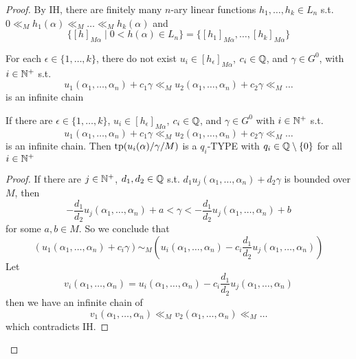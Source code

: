 \documentclass[11pt]{article}
\begin{document}
\begin{proof}
By IH, there are finitely many \(n\)-ary linear functions \(h_1,\dots,h_k\in L_n\)
s.t. \(0\ll_Mh_1(\alpha)\ll_M\dots\ll_Mh_k(\alpha)\) and
\begin{equation*}
\{[h]_{M\alpha}\mid 0<h(\alpha)\in L_n\}=\{[h_1]_{M\alpha},\dots,[h_k]_{M\alpha}\}
\end{equation*}
\begin{claim}
For each \(\epsilon\in\{1,\dots,k\}\), there do not
exist \(u_i\in[h_\epsilon]_{M\alpha}\), \(c_i\in\mathbb{Q}\), and \(\gamma\in G^0\), with \(i\in\mathbb{N}^+\)
s.t.
\begin{equation*}
u_1(\alpha_1,\dots,\alpha_n)+c_1\gamma\ll_Mu_2(\alpha_1,\dots,\alpha_n)+c_2\gamma\ll_M\dots
\end{equation*}
is an infinite chain
\end{claim}

\begin{claim}
If there are \(\epsilon\in\{1,\dots,k\}\), \(u_i\in[h_\epsilon]_{M\alpha}\), \(c_i\in\mathbb{Q}\),
and \(\gamma\in G^0\) with \(i\in\mathbb{N}^+\) s.t.
\begin{equation*}
u_1(\alpha_1,\dots,\alpha_n)+c_1\gamma\ll_Mu_2(\alpha_1,\dots,\alpha_n)+c_2\gamma\ll_M\dots
\end{equation*}
is an infinite chain. Then \(\operatorname{tp}(u_i(\alpha)/\gamma/M)\) is a \(q_i\)-TYPE
with \(q_i\in\mathbb{Q}\setminus\{0\}\) for all \(i\in\mathbb{N}^+\)
\end{claim}

\begin{proof}
If there are \(j\in\mathbb{N}^+\), \(d_1,d_2\in\mathbb{Q}\) s.t. \(d_1u_j(\alpha_1,\dots,\alpha_n)+d_2\gamma\) is bounded over \(M\), then
\begin{equation*}
-\frac{d_1}{d_2}u_j(\alpha_1,\dots,\alpha_n)+a<\gamma<-\frac{d_1}{d_2}u_j(\alpha_1,\dots,\alpha_n)+b
\end{equation*}
for some \(a,b\in M\). So we conclude that
\begin{equation*}
(u_1(\alpha_1,\dots,\alpha_n)+c_i\gamma)\sim_M
(u_i(\alpha_1,\dots,\alpha_n)-c_i\frac{d_1}{d_2}u_j(\alpha_1,\dots,\alpha_n))
\end{equation*}
Let
\begin{equation*}
v_i(\alpha_1,\dots,\alpha_n)=u_i(\alpha_1,\dots,\alpha_n)-c_i
\frac{d_1}{d_2}u_j(\alpha_1,\dots,\alpha_n)
\end{equation*}
then we have an infinite chain of
\begin{equation*}
v_1(\alpha_1,\dots,\alpha_n)\ll_Mv_2(\alpha_1,\dots,\alpha_n)\ll_M\dots
\end{equation*}
which contradicts IH.


\end{proof}
\end{proof}
\end{document}

